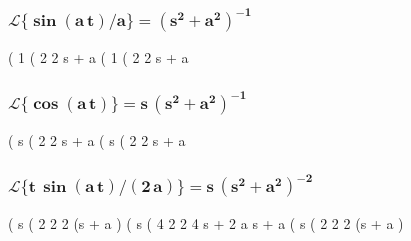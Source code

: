 \documentclass[12pt]{article}
\begin{document}
\subsubsection*{$\mathbf{ \mathcal{L} \{\boldsymbol{\sin}(a\,t)/a\} = (s^{2}+a^{2})^{-1} }$}
\begin{myVerbatim}
(%
                                       1
(%
                                     2    2
                                    s  + a
(%
                                       1
(%
                                     2    2
                                    s  + a
\end{myVerbatim}
\subsubsection*{$\mathbf{\mathcal{L} \{\boldsymbol{\cos}(a\,t)\} = s \,(s^{2}+a^{2})^{-1} }$}
\begin{myVerbatim}
(%
                                       s
(%
                                     2    2
                                    s  + a
(%
                                       s
(%
                                     2    2
                                    s  + a
\end{myVerbatim}
\subsubsection*{$\mathbf{\mathcal{L} \{t\,\boldsymbol{\sin}(a\,t)/(2\,a)\} = s\,(s^{2}+a^{2})^{-2}}$}
\begin{myVerbatim}
(%
                                      s
(%
                                    2    2 2
                                  (s  + a )
(%
                                       s
(%
                                4      2  2    4
                               s  + 2 a  s  + a
(%
                                      s
(%
                                    2    2 2
                                  (s  + a )
\end{myVerbatim}
\end{document}
